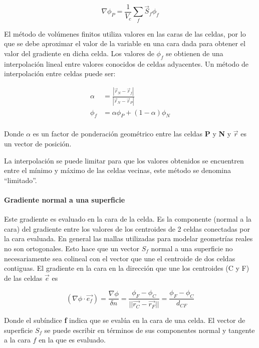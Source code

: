 \begin{equation}
  \label{eq:green_gauss_gradient}
  \nabla \phi_{P} = \frac{1}{V_{c}}\sum_{f} \vec{S}_{f}\phi_{f}
\end{equation}

El método de volúmenes finitos utiliza valores en las caras de las celdas, por
lo que se debe aproximar el valor de la variable en una cara dada para obtener
el valor del gradiente en dicha celda.
%
Los valores de $\phi_{f}$ se obtienen de una interpolación lineal entre valores
conocidos de celdas adyacentes.
%
Un método de interpolación entre celdas puede ser:

\begin{align}
  \label{eq:interpolacion_lineal_caras}
  \alpha &= \frac{|{\vec{r}_{N}-\vec{r}_{f}}|} {|{\vec{r}_{N}-\vec{r}_{P}}|}\\
  \phi_{f} &= \alpha\phi_{P}+(1-\alpha)\phi_{N} \\
\end{align}

Donde $\alpha$ es un factor de ponderación geométrico entre las celdas \textbf{P} y
\textbf{N} y $\vec{r}$ es un vector de posición.

La interpolación se puede limitar para que los valores obtenidos se encuentren
entre el mínimo y máximo de las celdas vecinas, este método se denomina
``limitado''.


\paragraph{Gradiente normal a una superficie}
%
Este gradiente es evaluado en la cara de la celda.
%
Es la componente (normal a la cara) del gradiente entre los valores de los
centroides de 2 celdas conectadas por la cara evaluada.
%
En general las mallas utilizadas para modelar geometrías reales no son
ortogonales.
%
Esto hace que un vector $S_{f}$ normal a una superficie no necesariamente sea
colineal con el vector que une el centroide de dos celdas contiguas.
%
El gradiente en la cara en la dirección que une los centroides (C y F) de las
celdas $\vec{e}$ es

\begin{equation}
  \label{eq:gradiente_normal}
  (\nabla \phi \cdot \vec{e_{f}}) = \frac{\nabla\phi}{\delta n} = \frac{\phi_{F} - \phi_{C}}{||\vec{r_{C}}-\vec{r_{F}}||} = \frac{\phi_{F} - \phi_{C}}{d_{CF}}
\end{equation}

Donde el subíndice \textbf{f} indica que se evalúa en la cara de una celda.
%
El vector de superficie $S_{f}$ se puede escribir en términos de sus componentes
normal y tangente a la cara $f$ en la que es evaluado.

